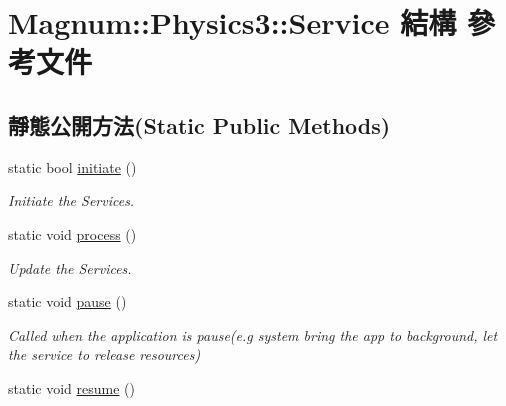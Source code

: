 \hypertarget{struct_magnum_1_1_physics3_1_1_service}{}\section{Magnum\+:\+:Physics3\+:\+:Service 結構 參考文件}
\label{struct_magnum_1_1_physics3_1_1_service}
\subsection*{靜態公開方法(Static Public Methods)}
\begin{DoxyCompactItemize}
\item 
static bool \hyperlink{struct_magnum_1_1_physics3_1_1_service_ae62395781b5f714e107c1bed24058b1e}{initiate} ()
\begin{DoxyCompactList}\small\item\em Initiate the Services. \end{DoxyCompactList}\item 
static void \hyperlink{struct_magnum_1_1_physics3_1_1_service_a5dd171fc418f1c7d91a83827c1d431ce}{process} ()\hypertarget{struct_magnum_1_1_physics3_1_1_service_a5dd171fc418f1c7d91a83827c1d431ce}{}\label{struct_magnum_1_1_physics3_1_1_service_a5dd171fc418f1c7d91a83827c1d431ce}

\begin{DoxyCompactList}\small\item\em Update the Services. \end{DoxyCompactList}\item 
static void \hyperlink{struct_magnum_1_1_physics3_1_1_service_ab425f99f750e6d2b9eb59af799e70f88}{pause} ()\hypertarget{struct_magnum_1_1_physics3_1_1_service_ab425f99f750e6d2b9eb59af799e70f88}{}\label{struct_magnum_1_1_physics3_1_1_service_ab425f99f750e6d2b9eb59af799e70f88}

\begin{DoxyCompactList}\small\item\em Called when the application is pause(e.\+g system bring the app to background, let the service to release resources) \end{DoxyCompactList}\item 
static void \hyperlink{struct_magnum_1_1_physics3_1_1_service_aeb5bec64e0de70fb155a72b7c4bb9436}{resume} ()\hypertarget{struct_magnum_1_1_physics3_1_1_service_aeb5bec64e0de70fb155a72b7c4bb9436}{}\label{struct_magnum_1_1_physics3_1_1_service_aeb5bec64e0de70fb155a72b7c4bb9436}


\end{DoxyCompactItemize}

